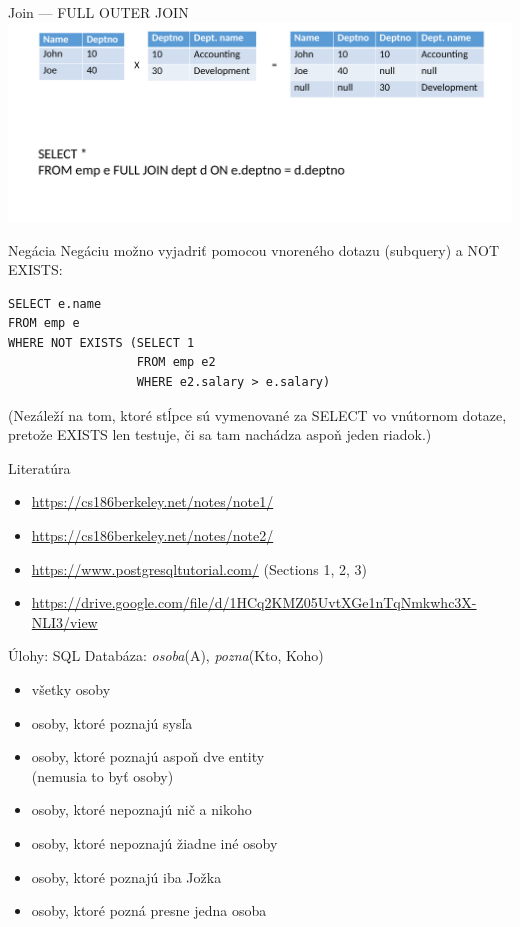 \documentclass[12pt]{beamer}
\begin{document}
\begin{frame}{Join --- FULL OUTER JOIN}
\includegraphics[scale=.12]{join5}
\end{frame}

\begin{frame}[fragile]{Negácia}
Negáciu možno vyjadriť pomocou vnoreného dotazu (subquery) a NOT EXISTS:
\begin{verbatim}
SELECT e.name
FROM emp e
WHERE NOT EXISTS (SELECT 1
                  FROM emp e2 
                  WHERE e2.salary > e.salary)
\end{verbatim}
(Nezáleží na tom, ktoré stĺpce sú vymenované za SELECT vo vnútornom dotaze, pretože EXISTS len testuje, či sa tam nachádza aspoň jeden riadok.)
\end{frame}



\begin{frame}{Literatúra}
\begin{itemize}
\item {\scriptsize\url{https://cs186berkeley.net/notes/note1/}}
\item {\scriptsize\url{https://cs186berkeley.net/notes/note2/}}
\item {\scriptsize\url{https://www.postgresqltutorial.com/} (Sections 1, 2, 3)}
\item {\scriptsize\url{https://drive.google.com/file/d/1HCq2KMZ05UvtXGe1nTqNmkwhc3X-NLI3/view}}
\end{itemize}
\end{frame}


\begin{frame}{Úlohy: SQL}
Databáza: \emph{osoba}(A), \emph{pozna}(Kto, Koho)
\begin{itemize}
	\item všetky osoby
    \item osoby, ktoré poznajú sysľa
    \item osoby, ktoré poznajú aspoň dve entity\\ (nemusia to byť osoby)
    \item osoby, ktoré nepoznajú nič a nikoho
    \item osoby, ktoré nepoznajú žiadne iné osoby
    \item osoby, ktoré poznajú iba Jožka
    \item osoby, ktoré pozná presne jedna osoba
\end{itemize}
\end{frame}
\end{document}
